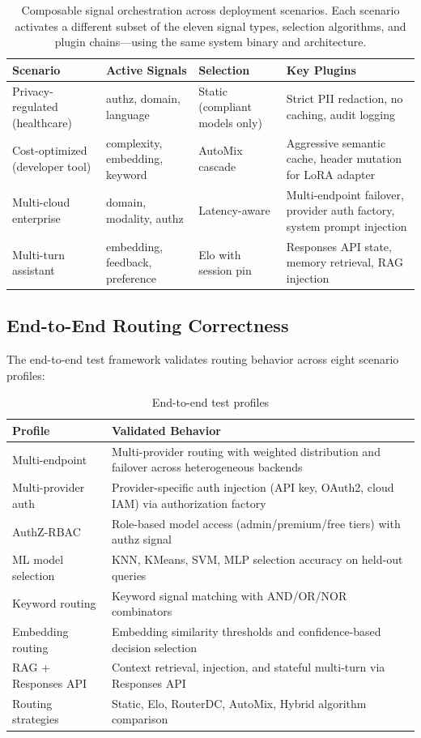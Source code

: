 \begin{table}[h]
\centering
\caption{Composable signal orchestration across deployment scenarios. Each scenario activates a different subset of the eleven signal types, selection algorithms, and plugin chains---using the same system binary and architecture.}
\label{tab:deployment_scenarios}
\begin{tabular}{p{2.5cm}p{3cm}p{2.5cm}p{3.5cm}}
\toprule
\textbf{Scenario} & \textbf{Active Signals} & \textbf{Selection} & \textbf{Key Plugins} \\
\midrule
Privacy-regulated (healthcare) & authz, domain, language & Static (compliant models only) & Strict PII redaction, no caching, audit logging \\
Cost-optimized (developer tool) & complexity, embedding, keyword & AutoMix cascade & Aggressive semantic cache, header mutation for LoRA adapter \\
Multi-cloud enterprise & domain, modality, authz & Latency-aware & Multi-endpoint failover, provider auth factory, system prompt injection \\
Multi-turn assistant & embedding, feedback, preference & Elo with session pin & Responses API state, memory retrieval, RAG injection \\
\bottomrule
\end{tabular}
\end{table}

\subsection{End-to-End Routing Correctness}

The end-to-end test framework validates routing behavior across eight scenario profiles:

\begin{table}[h]
\centering
\caption{End-to-end test profiles}
\label{tab:e2e_profiles}
\begin{tabular}{lp{8cm}}
\toprule
\textbf{Profile} & \textbf{Validated Behavior} \\
\midrule
Multi-endpoint      & Multi-provider routing with weighted distribution and failover across heterogeneous backends \\
Multi-provider auth & Provider-specific auth injection (API key, OAuth2, cloud IAM) via authorization factory \\
AuthZ-RBAC          & Role-based model access (admin/premium/free tiers) with authz signal \\
ML model selection  & KNN, KMeans, SVM, MLP selection accuracy on held-out queries \\
Keyword routing     & Keyword signal matching with AND/OR/NOR combinators \\
Embedding routing   & Embedding similarity thresholds and confidence-based decision selection \\
RAG + Responses API & Context retrieval, injection, and stateful multi-turn via Responses API \\
Routing strategies  & Static, Elo, RouterDC, AutoMix, Hybrid algorithm comparison \\
\bottomrule
\end{tabular}
\end{table}

